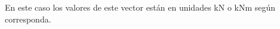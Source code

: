 En este caso los valores de este vector están en unidades kN o kNm según corresponda.
%
%
%
%
%
%
%
%
%
%
%
%
%
%
%

